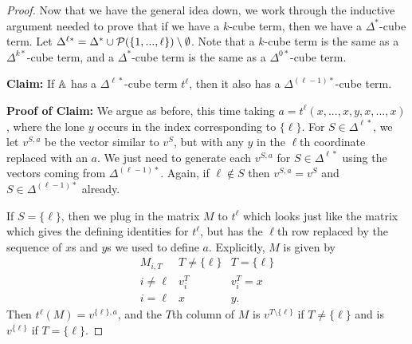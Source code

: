 \documentclass[letterpaper,11pt]{article}
\begin{document}
\begin{proof}
Now that we have the general idea down, we work through the inductive argument needed to prove that if we have a $k$-cube term, then we have a $\Delta^*$-cube term. Let $\Delta^{\ell *} = \Delta^* \cup \mathcal{P}(\{1,..., \ell\})\setminus \emptyset$. Note that a $k$-cube term is the same as a $\Delta^{k *}$-cube term, and a $\Delta^*$-cube term is the same as a $\Delta^{0*}$-cube term.

{\bf Claim:} If $\mathbb{A}$ has a $\Delta^{\ell *}$-cube term $t^\ell$, then it also has a $\Delta^{(\ell -1)*}$-cube term.

{\bf Proof of Claim:} We argue as before, this time taking $a = t^\ell(x,...,x,y,x,...,x)$, where the lone $y$ occurs in the index corresponding to $\{\ell\}$. For $S \in \Delta^{\ell *}$, we let $v^{S,a}$ be the vector similar to $v^S$, but with any $y$ in the $\ell$th coordinate replaced with an $a$. We just need to generate each $v^{S,a}$ for $S \in \Delta^{\ell *}$ using the vectors coming from $\Delta^{(\ell-1)*}$. Again, if $\ell \not\in S$ then $v^{S,a} = v^S$ and $S \in \Delta^{(\ell-1)*}$ already.

If $S = \{\ell\}$, then we plug in the matrix $M$ to $t^\ell$ which looks just like the matrix which gives the defining identities for $t^\ell$, but has the $\ell$th row replaced by the sequence of $x$s and $y$s we used to define $a$. Explicitly, $M$ is given by
\[
\begin{array}{c|cc} M_{i,T} & T \ne \{\ell\} & T = \{\ell\}\\ \hline i \ne \ell & v^T_i & v^T_i=x\\ i = \ell & x & y.\end{array}
\]
Then $t^\ell(M) = v^{\{\ell\},a}$, and the $T$th column of $M$ is $v^{T\setminus\{\ell\}}$ if $T \ne \{\ell\}$ and is $v^{\{\ell\}}$ if $T = \{\ell\}$.


\end{proof}
\end{document}
